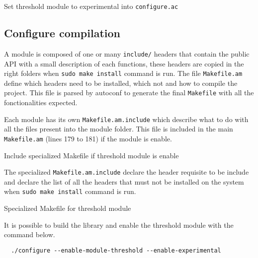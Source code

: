 \begin{listing}
	\caption{Set threshold module to experimental into \texttt{configure.ac}}
	\label{lst:setModuleExperimental}
\end{listing}

\subsection{Configure compilation}

A module is composed of one or many \texttt{include/} headers that
contain the public API with a small description of each functions, these headers
are copied in the right folders when \texttt{sudo make install} command is run.
The file \texttt{Makefile.am} define which headers need to be installed, which
not and how to compile the project. This file is parsed by autoconf to generate
the final \texttt{Makefile} with all the fonctionalities expected.

Each module has its own \texttt{Makefile.am.include} which describe what to do
with all the files present into the module folder. This file is included in the
main \texttt{Makefile.am} (lines 179 to 181) if the module is enable.

\begin{listing}
	\caption{Include specialized Makefile if threshold module is enable}
	\label{lst:includeSpecializedMakefile}
\end{listing}

The specialized \texttt{Makefile.am.include} declare the header requisite to be
include and declare the list of all the headers that must not be installed on
the system when \texttt{sudo make install} command is run.

\begin{listing}
	\caption{Specialized Makefile for threshold module}
	\label{lst:specializedMakefile}
\end{listing}

It is possible to build the library and enable the threshold module with the
command below.

\begin{verbatim}
  ./configure --enable-module-threshold --enable-experimental
\end{verbatim}


